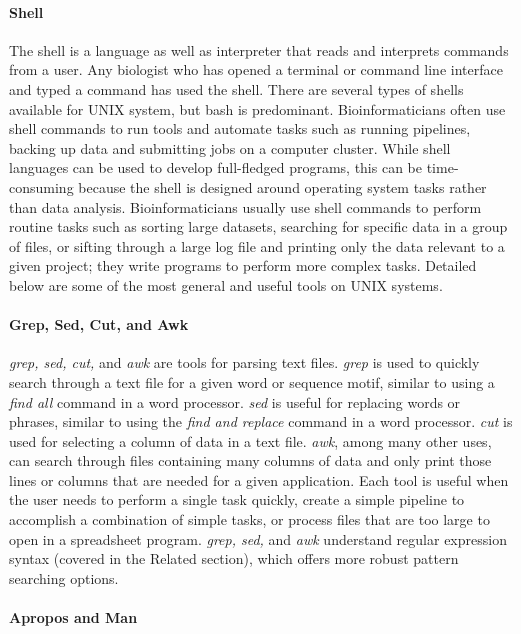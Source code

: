 \documentclass[ChapterTOCs,krantz2]{krantz} %
\begin{document}
\paragraph{Shell}

The shell is a language as well as interpreter that reads and interprets commands
from a user. Any biologist who has opened a terminal or command line interface
and typed a command has used the shell. There are several types of shells available for UNIX
system, but bash is predominant. 
Bioinformaticians often use shell commands to
run tools and automate tasks such as running pipelines, backing up
data and submitting jobs on a computer cluster. While shell languages can be
used to develop full-fledged programs, this can be time-consuming 
because the shell is designed around operating system tasks rather than
data analysis.
Bioinformaticians usually use shell commands to perform routine tasks such as
sorting large datasets,
searching for specific data in a group of files, or sifting through a large log
file and printing only the data relevant to a given project; they write programs to perform 
more complex tasks.  Detailed below are
some of the most general and useful tools on
UNIX systems.

\paragraph{Grep, Sed, Cut, and Awk}

\emph{grep, sed, cut,} and \emph{awk} are tools for parsing text files.
\emph{grep} is used to
quickly search through a  text file for a given word or sequence
motif, similar to using a \emph{find all} command in a word processor.  \emph{sed} is
useful for replacing words or phrases,
similar to using the \emph{find and replace} command in a word processor.
\emph{cut} is
used for selecting a column of data in a text file.  \emph{awk}, among many other uses, 
can search through files containing many columns of data and only print
those lines or columns that are needed for a given application.  
Each tool is useful when the user needs to
perform a single task quickly, create a simple pipeline to accomplish a
combination of simple tasks, or process files that are too large to open in a
spreadsheet program.  \emph{grep, sed,} and \emph{awk} understand regular expression
syntax (covered in the Related section), which offers more robust pattern searching options.  

\paragraph{Apropos and Man}
\end{document}
